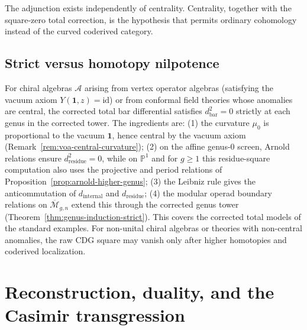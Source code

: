 The adjunction exists independently of centrality. Centrality, together
with the square-zero total correction, is the hypothesis that permits
ordinary cohomology instead of the curved coderived category.

\subsection{Strict versus homotopy nilpotence}
\label{subsec:strict-vs-homotopy-nilpotence}

\begin{remark}
For chiral algebras $\mathcal{A}$ arising from vertex operator algebras
(satisfying the vacuum axiom $Y(\mathbf{1},z) = \mathrm{id}$) or from
conformal field theories whose anomalies are central, the corrected
total bar differential satisfies $d_{\text{bar}}^2 = 0$ strictly at
each genus in the corrected tower. The ingredients are: (1) the curvature $\mu_0$ is
proportional to the vacuum $\mathbf{1}$, hence central by the vacuum
axiom (Remark~\ref{rem:voa-central-curvature}); (2) on the affine
genus-$0$ screen, Arnold relations ensure $d_{\mathrm{residue}}^2 = 0$,
while on $\mathbb{P}^1$ and for $g\geq1$ this residue-square
computation also uses the projective and period relations of
Proposition~\ref{prop:arnold-higher-genus}; (3) the Leibniz rule gives
the anticommutation of $d_{\mathrm{internal}}$ and
$d_{\mathrm{residue}}$; (4) the modular operad boundary relations on
$\overline{\mathcal{M}}_{g,n}$ extend this through the corrected genus tower
(Theorem~\ref{thm:genus-induction-strict}). This covers the corrected
total models of the standard examples. For non-unital chiral algebras
or theories with non-central anomalies, the raw CDG square may vanish
only after higher homotopies and coderived localization.
\end{remark}


\section{Reconstruction, duality, and the Casimir transgression}
\label{sec:reconstruction-duality-casimir}

